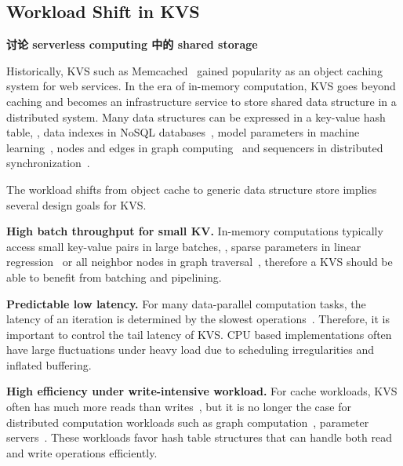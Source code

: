 \subsection{Workload Shift in KVS}
\label{kvdirect:sec:workload-shift}

\textbf{讨论 serverless computing 中的 shared storage}

Historically, KVS such as Memcached~\cite{fitzpatrick2004distributed} gained popularity as an object caching system for web services.
In the era of in-memory computation, KVS goes beyond caching and becomes an infrastructure service to store shared data structure in a distributed system.
Many data structures can be expressed in a key-value hash table, \eg, data indexes in NoSQL databases~\cite{chang2008bigtable}, model parameters in machine learning~\cite{li2014scaling}, nodes and edges in graph computing~\cite{shao2013trinity, xiao17tux2} and sequencers in distributed synchronization~\cite{kalia2016design,eris}.

The workload shifts from object cache to generic data structure store implies several design goals for KVS.

\textbf{High batch throughput for small KV.}
In-memory computations typically access small key-value pairs in large batches, \eg, sparse parameters in linear regression~\cite{li2014algorithmic, xiao17tux2} or all neighbor nodes in graph traversal~\cite{shao2013trinity}, therefore a KVS should be able to benefit from batching and pipelining.

\textbf{Predictable low latency.}
For many data-parallel computation tasks, the latency of an iteration is determined by the slowest operations~\cite{ousterhout2015ramcloud}. Therefore, it is important to control the tail latency of KVS. CPU based implementations often have large fluctuations under heavy load due to scheduling irregularities and inflated buffering.

\textbf{High efficiency under write-intensive workload.}
For cache workloads, KVS often has much more reads than writes~\cite{atikoglu2012workload}, but it is no longer the case for distributed computation workloads
such as graph computation~\cite{page1999pagerank}, parameter servers~\cite{li2014scaling}.
These workloads favor hash table structures that can handle both read and write operations efficiently.


